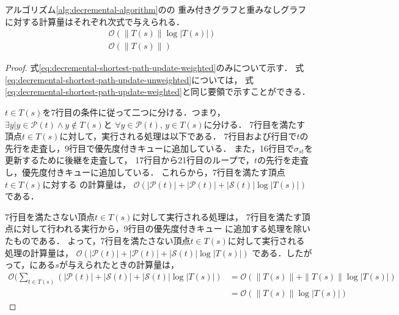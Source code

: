 \begin{theorem}
  \label{thm:decremental-shortest-path-update}
  アルゴリズム\ref{alg:decremental-algorithm}のの
  重み付きグラフと重みなしグラフに対する計算量はそれぞれ次式で与えられる．
  \begin{align}
    &\mathcal{O}\left(\|T(s)\|\log|T(s)|\right)
    \label{eq:decremental-shortest-path-update-weighted} \\
    &\mathcal{O}\left(\|T(s)\|\right)
    \label{eq:decremental-shortest-path-update-unweighted}
  \end{align}
\end{theorem}
\begin{proof}
  式\eqref{eq:decremental-shortest-path-update-weighted}のみについて示す．
  式\eqref{eq:decremental-shortest-path-update-unweighted}については，
  式\eqref{eq:decremental-shortest-path-update-weighted}と同じ要領で示すことができる．

  $t\in T(s)$を7行目の条件に従って二つに分ける．つまり，
  $\exists y|y\in\mathcal{P}(t)\land y\notin T(s)$と
  $\forall y\in\mathcal{P}(t),\,y\in T(s)$に分ける．
  7行目を満たす頂点$t\in T(s)$に対して，実行される処理は以下である．
  7行目および行目で$t$の先行を走査し，9行目で優先度付きキューに追加している．
  また，16行目で$\sigma_{st}$を更新するために後継を走査して，
  17行目から21行目のループで，$t$の先行を走査し，優先度付きキューに追加している．
  これらから，7行目を満たす頂点$t\in T(s)$に対する
  の計算量は，
  $\mathcal{O}(|\mathcal{P}(t)|+|\mathcal{P}(t)|+|\mathcal{S}(t)|\log|T(s)|)$
  である．

  7行目を満たさない頂点$t\in T(s)$に対して実行される処理は，
  7行目を満たす頂点に対して行われる実行から，9行目の優先度付きキュー
  に追加する処理を除いたものである．
  よって，7行目を満たさない頂点$t\in T(s)$に対して実行される処理の計算量は，
  $\mathcal{O}(|\mathcal{P}(t)|+|\mathcal{P}(t)|+|\mathcal{S}(t)|\log|T(s)|)$
  である．したがって，にある$s$が与えられたときの計算量は，
  \begin{equation*}
    \begin{aligned}
      \mathcal{O}(\sum_{t\in T(s)}(|\mathcal{P}(t)|+|\mathcal{S}(t)|+|\mathcal{S}(t)|\log|T(s)|)
      &=\mathcal{O}(\|T(s)\|+\|T(s)\|\log|T(s)|) \\
      &=\mathcal{O}(\|T(s)\|\log|T(s)|)
    \end{aligned}
  \end{equation*}
\end{proof}

